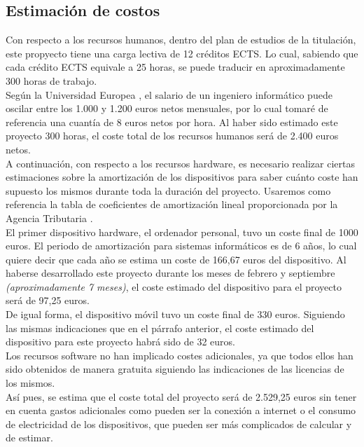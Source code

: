\subsection{Estimación de costos}

Con respecto a los recursos humanos, dentro del plan de estudios de la titulación, este propyecto tiene una carga lectiva de 12 créditos ECTS. Lo cual, sabiendo que cada crédito ECTS equivale a 25 horas, se puede traducir en aproximadamente 300 horas de trabajo.\\

Según la Universidad Europea \cite{universidad-europea-2021}, el salario de un ingeniero informático puede oscilar entre los 1.000 y 1.200 euros netos mensuales, por lo cual tomaré de referencia una cuantía de 8 euros netos por hora. Al haber sido estimado este proyecto 300 horas, el coste total de los recursos humanos será de 2.400 euros netos.\\

A continuación, con respecto a los recursos hardware, es necesario realizar ciertas estimaciones sobre la amortización de los dispositivos para saber cuánto coste han supuesto los mismos durante toda la duración del proyecto. Usaremos como referencia la tabla de coeficientes de amortización lineal proporcionada por la Agencia Tributaria \cite{amortizacion-agencia-tributaria}.\\

El primer dispositivo hardware, el ordenador personal, tuvo un coste final de 1000 euros. El periodo de amortización para sistemas informáticos es de 6 años, lo cual quiere decir que cada año se estima un coste de 166,67 euros del dispositivo. Al haberse desarrollado este proyecto durante los meses de febrero y septiembre \textit{(aproximadamente 7 meses)}, el coste estimado del dispositivo para el proyecto será de 97,25 euros.\\

De igual forma, el dispositivo móvil tuvo un coste final de 330 euros. Siguiendo las mismas indicaciones que en el párrafo anterior, el coste estimado del dispositivo para este proyecto habrá sido de 32 euros.\\

Los recursos software no han implicado costes adicionales, ya que todos ellos han sido obtenidos de manera gratuita siguiendo las indicaciones de las licencias de los mismos.\\

Así pues, se estima que el coste total del proyecto será de 2.529,25 euros sin tener en cuenta gastos adicionales como pueden ser la conexión a internet o el consumo de electricidad de los dispositivos, que pueden ser más complicados de calcular y de estimar.